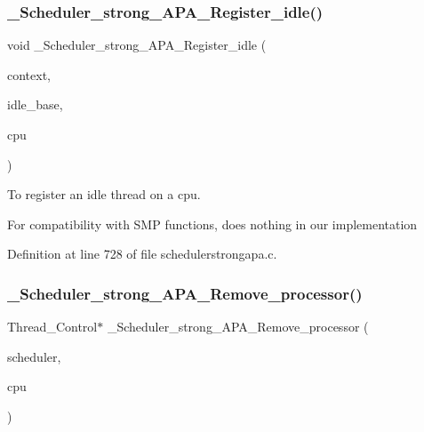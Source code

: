 \subsubsection{\texorpdfstring{\+\_\+\+Scheduler\+\_\+strong\+\_\+\+A\+P\+A\+\_\+\+Register\+\_\+idle()}{\_Scheduler\_strong\_APA\_Register\_idle()}}
{\footnotesize\ttfamily void \+\_\+\+Scheduler\+\_\+strong\+\_\+\+A\+P\+A\+\_\+\+Register\+\_\+idle (\begin{DoxyParamCaption}\item[{Scheduler\+\_\+\+Context $\ast$}]{context,  }\item[{Scheduler\+\_\+\+Node $\ast$}]{idle\+\_\+base,  }\item[{Per\+\_\+\+C\+P\+U\+\_\+\+Control $\ast$}]{cpu }\end{DoxyParamCaption})}



To register an idle thread on a cpu. 

For compatibility with S\+MP functions, does nothing in our implementation 

Definition at line 728 of file schedulerstrongapa.\+c.

\mbox{\label{group__RTEMSScoreSchedulerStrongAPA_ga91dc29dcdeea35e3329623be7a798e39}} 
\subsubsection{\texorpdfstring{\+\_\+\+Scheduler\+\_\+strong\+\_\+\+A\+P\+A\+\_\+\+Remove\+\_\+processor()}{\_Scheduler\_strong\_APA\_Remove\_processor()}}
{\footnotesize\ttfamily Thread\+\_\+\+Control$\ast$ \+\_\+\+Scheduler\+\_\+strong\+\_\+\+A\+P\+A\+\_\+\+Remove\+\_\+processor (\begin{DoxyParamCaption}\item[{const Scheduler\+\_\+\+Control $\ast$}]{scheduler,  }\item[{Per\+\_\+\+C\+P\+U\+\_\+\+Control $\ast$}]{cpu }\end{DoxyParamCaption})}



